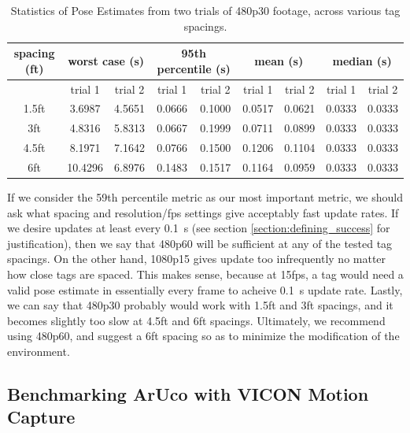 \documentclass{article}
\begin{document}
    \begin{table}[H]
      \centering
      \begin{tabular}{|c|c|c|c|c|c|c|c|c|} \hline
        spacing (ft) & \multicolumn{2}{c}{worst case (s)} & \multicolumn{2}{c}{95th percentile (s)} & \multicolumn{2}{c}{mean (s)} & \multicolumn{2}{c|}{median (s)} \\ \hline
            & trial 1 & trial 2 & trial 1 & trial 2 & trial 1 & trial 2 & trial 1 & trial 2 \\ \hline
        1.5ft & 3.6987 & 4.5651 & 0.0666 & 0.1000 & 0.0517 & 0.0621 & 0.0333 & 0.0333 \\ \hline
        3ft   & 4.8316 & 5.8313 & 0.0667 & 0.1999 & 0.0711 & 0.0899 & 0.0333 & 0.0333 \\ \hline
        4.5ft & 8.1971 & 7.1642 & 0.0766 & 0.1500 & 0.1206 & 0.1104 & 0.0333 & 0.0333 \\ \hline
        6ft   & 10.4296 & 6.8976 & 0.1483 & 0.1517 & 0.1164 & 0.0959 & 0.0333 & 0.0333 \\ \hline
      \end{tabular}
      \caption{Statistics of Pose Estimates from two trials of 480p30 footage, across various tag spacings.}
      \label{table:480p30_pose_estimate_stats}
    \end{table}

    If we consider the 59th percentile metric as our most important metric, we should ask what spacing and resolution/fps settings give acceptably fast update rates. If we desire updates at least every \SI{0.1}{\second} (see section \ref{section:defining_success} for justification), then we say that 480p60 will be sufficient at any of the tested tag spacings. On the other hand, 1080p15 gives update too infrequently no matter how close tags are spaced. This makes sense, because at 15fps, a tag would need a valid pose estimate in essentially every frame to acheive \SI{0.1}{\second} update rate. Lastly, we can say that 480p30 probably would work with 1.5ft and 3ft spacings, and it becomes slightly too slow at 4.5ft and 6ft spacings. Ultimately, we recommend using 480p60, and suggest a 6ft spacing so as to minimize the modification of the environment.


	\subsection{Benchmarking ArUco with VICON Motion Capture}
\end{document}
